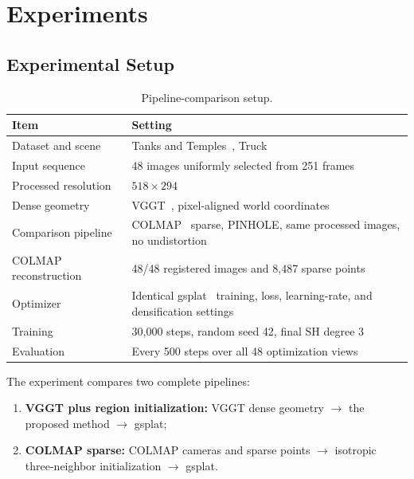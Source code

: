 \documentclass[11pt,a4paper]{article}
\begin{document}
\section{Experiments}

\subsection{Experimental Setup}

\begin{table}[htbp]
  \centering
  \caption{Pipeline-comparison setup.}
  \label{tab:experiment}
  \small
  \begin{tabularx}{\textwidth}{@{}>{\raggedright\arraybackslash}p{38mm}Y@{}}
    \toprule
    \textbf{Item} & \textbf{Setting} \\
    \midrule
    Dataset and scene & Tanks and Temples~\cite{knapitsch2017tanks}, Truck \\
    Input sequence & 48 images uniformly selected from 251 frames \\
    Processed resolution & $518\times294$ \\
    Dense geometry & VGGT~\cite{wang2025vggt}, pixel-aligned world coordinates \\
    Comparison pipeline & COLMAP~\cite{schoenberger2016sfm} sparse, PINHOLE, same processed images, no undistortion \\
    COLMAP reconstruction & 48/48 registered images and 8,487 sparse points \\
    Optimizer & Identical gsplat~\cite{ye2025gsplat} training, loss, learning-rate, and densification settings \\
    Training & 30,000 steps, random seed 42, final SH degree 3 \\
    Evaluation & Every 500 steps over all 48 optimization views \\
    \bottomrule
  \end{tabularx}
\end{table}

The experiment compares two complete pipelines:

\begin{enumerate}
  \item \textbf{VGGT plus region initialization:} VGGT dense geometry $\rightarrow$ the proposed method $\rightarrow$ gsplat;
  \item \textbf{COLMAP sparse:} COLMAP cameras and sparse points $\rightarrow$ isotropic three-neighbor initialization $\rightarrow$ gsplat.
\end{enumerate}
\end{document}
